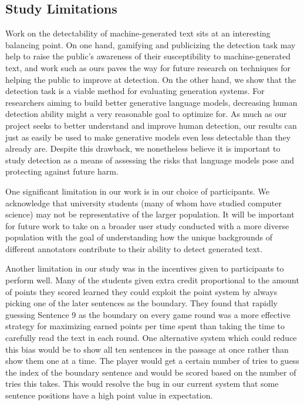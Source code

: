 \subsection{Study Limitations}
Work on the detectability of machine-generated text sits at an interesting balancing point.
On one hand, gamifying and publicizing the detection task may help to raise the public's awareness of their susceptibility to machine-generated text, and work such as ours paves the way for future research on techniques for helping the public to improve at detection.
On the other hand, we show that the detection task is a viable method for evaluating generation systems.
For researchers aiming to build better generative language models, decreasing human detection ability might a very reasonable goal to optimize for.
As much as our project seeks to better understand and improve human detection, our results can just as easily be used to make generative models even less detectable than they already are.
Despite this drawback, we nonetheless believe it is important to study detection as a means of assessing the risks that language models pose and protecting against future harm.

One significant limitation in our work is in our choice of participants.
We acknowledge that university students (many of whom have studied computer science) may not be representative of the larger population.
It will be important for future work to take on a broader user study conducted with a more diverse population with the goal of understanding how the unique backgrounds of different annotators contribute to their ability to detect generated text.

Another limitation in our study was in the incentives given to participants to perform well.
Many of the students given extra credit proportional to the amount of points they scored learned they could exploit the point system by always picking one of the later sentences as the boundary.
They found that rapidly guessing Sentence 9 as the boundary on every game round was a more effective strategy for maximizing earned points per time spent than taking the time to carefully read the text in each round.
One alternative system which could reduce this bias would be to show all ten sentences in the passage at once rather than show them one at a time.
The player would get a certain number of tries to guess the index of the boundary sentence and would be scored based on the number of tries this takes.
This would resolve the bug in our current system that some sentence positions have a high point value in expectation.

